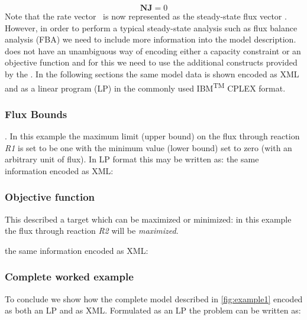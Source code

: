 %
\begin{equation}\label{eqn:kinmodsteady}
  \textbf{NJ} = 0
\end{equation}
%
Note that the rate vector \vvec\ is now represented as the steady-state
flux vector \Jvec. However, in order to perform a typical steady-state
analysis such as flux balance analysis (FBA) we need to include more
information into the model description. \sbmlthreecore does not have an
unambiguous way of encoding either a capacity constraint or an objective function and for this we need to use the additional constructs provided by the \FBCPackage. In the following sections the same model data is shown
encoded as XML and as a linear program (LP) in the commonly used IBM\textsuperscript{\tiny{TM}} \textsf{CPLEX} format.


\subsubsection{Flux Bounds}
\label{examples1:fluxbound}
. In this example the maximum limit (upper bound) on the flux through reaction \textit{R1} is set to be one with the minimum value (lower bound) set to zero (with an arbitrary unit of flux). In LP format this may be written as:
%
%
the same information encoded as XML:
%

\medskip
\subsubsection{Objective function}
\label{examples1:objfunc}
This described a target which can be maximized or minimized: in this
example the flux through reaction \textit{R2} will be
\textit{maximized}.

%
%
the same information encoded as XML:
%

\subsubsection{Complete worked example}
\label{examples1:complete}
To conclude we show how the complete model described in
\ref{fig:example1} encoded as both an LP and as XML. Formulated as an LP
the problem can be written as:

